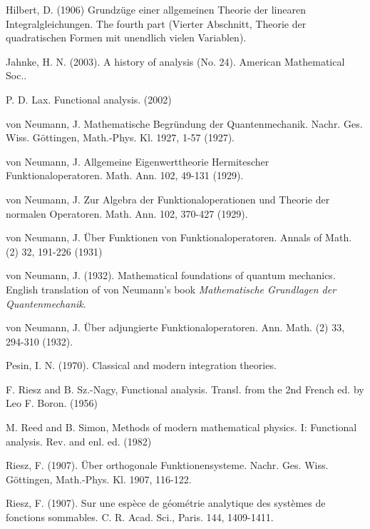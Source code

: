 \documentclass[12pt,b5paper,notitlepage]{article}
\theoremstyle{definition}
\theoremstyle{plain}
\numberwithin{equation}{section}
\begin{document}
\begin{thebibliography}{999999}
Hilbert, D. (1906) Grundz\"uge einer allgemeinen Theorie der linearen Integralgleichungen. The fourth part (Vierter Abschnitt, Theorie der quadratischen Formen mit unendlich vielen Variablen).

Jahnke, H. N. (2003). A history of analysis (No. 24). American Mathematical Soc..

P. D. Lax. Functional analysis. (2002)

von Neumann, J. Mathematische {Begr{\"u}ndung} der {Quantenmechanik}. Nachr. Ges. Wiss. G{\"o}ttingen, Math.-Phys. Kl. 1927, 1-57 (1927).


von Neumann, J. Allgemeine Eigenwerttheorie Hermitescher Funktionaloperatoren. Math. Ann. 102, 49-131 (1929).


von Neumann, J. Zur Algebra der Funktionaloperationen und Theorie der normalen Operatoren. Math. Ann. 102, 370-427 (1929).



von Neumann, J. \"Uber Funktionen von Funktionaloperatoren. Annals of Math. (2) 32, 191-226 (1931)


von Neumann, J. (1932). Mathematical foundations of quantum mechanics. English translation of von Neumann's book \textit{Mathematische Grundlagen der Quantenmechanik}.



von Neumann, J. {\"U}ber adjungierte {Funktionaloperatoren}. Ann. Math. (2) 33, 294-310 (1932).



Pesin, I. N. (1970). Classical and modern integration theories.


F. Riesz and B. Sz.-Nagy, Functional analysis. Transl. from the 2nd French ed. by Leo F.
Boron. (1956)

M. Reed and B. Simon, Methods of modern mathematical physics. {I}: {Functional} analysis. {Rev}. and enl. ed. (1982)

Riesz, F. (1907). \"Uber orthogonale Funktionensysteme. Nachr. Ges. Wiss. G{\"o}ttingen, Math.-Phys. Kl.  1907, 116-122.


Riesz, F. (1907). Sur une esp{\`e}ce de g{\'e}om{\'e}trie analytique des syst{\`e}mes de fonctions sommables. C. R. Acad. Sci., Paris.  144, 1409-1411.




\end{thebibliography}
\end{document}
